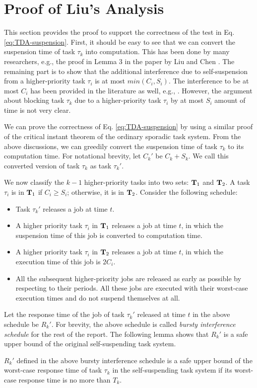 
\section{Proof of Liu's Analysis}  

This section provides the proof to support the correctness of the test in Eq. \eqref{eq:TDA-suspension}. First, it should be easy to see that we can convert the suspension time of task $\tau_k$ into computation. This has been done by many researchers, e.g., the proof in Lemma 3 in the paper by Liu and Chen \cite{Liu_2014}. The remaining part is to show that the additional interference due to self-suspension from a higher-priority task $\tau_i$ is at most $min(C_i, S_i)$. The interference to be at most $C_i$ has been provided in the literature as well, e.g., \cite{Rajkumar_1990}\cite{Liu_2014}. However, the argument about blocking task $\tau_k$ due to a higher-priority task $\tau_i$ by at most $S_i$ amount of time is not very clear. 

We can prove the correctness of Eq. \eqref{eq:TDA-suspension} by using a similar proof of the critical instant theorem of the ordinary sporadic task system. From the above discussions, we can greedily convert the suspension time of task $\tau_k$ to its computation time. For notational brevity, let $C_k'$ be $C_k + S_k$. We call this converted version of task $\tau_k$ as task $\tau_k'$. 

We now classify the $k-1$ higher-priority tasks into two sets: ${\bf T}_1$ and ${\bf T}_2$. A task $\tau_i$ is in ${\bf T}_1$ if $C_i \geq S_i$; otherwise, it is in ${\bf T}_2$.
Consider the following schedule:
\begin{itemize}
\item Task $\tau_k'$ releases a job at time $t$.
\item A higher priority task $\tau_i$ in ${\bf T}_1$ releases a job at time $t$, in which the suspension time of this job is converted to computation time.
\item A higher priority task $\tau_i$ in ${\bf T}_2$ releases a job at time $t$, in which the execution time of this job is $2C_i$.
\item All the subsequent higher-priority jobs are released as early as possible by respecting to their periods. All these jobs are executed with their worst-case execution times and do not suspend themselves at all.
\end{itemize}

Let the response time of the job of task $\tau_k'$ released at time $t$ in the above schedule be $R_k'$. For brevity, the above schedule is called \emph{bursty interference schedule} for the rest of the report. The following lemma shows that $R_k'$ is a safe upper bound of the original self-suspending task system. 

\begin{lemma}
\label{lemma:critical}
 $R_k'$ defined in the above bursty interference schedule is a safe upper bound of the worst-case response time of task $\tau_k$ in the self-suspending task system if its worst-case response time is no more than $T_k$.
\end{lemma}

  
  
